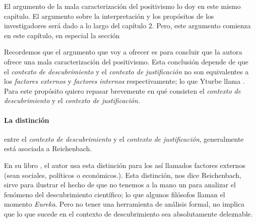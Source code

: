 El argumento de la mala caracterización del positivismo lo doy en este mismo capítulo.
El argumento sobre la interpretación y los propósitos de los investigadores será dado a lo largo del capítulo 2.
Pero, este argumento comienza en este capítulo, en especial la sección 

Recordemos que el argumento que voy a ofrecer es para concluir que la autora ofrece una mala caracterización del positivismo.
Esta conclusión depende de que el \emph{contexto de descubrimiento} y el \emph{contexto de justificación} no son equivalentes a los \emph{factores externos} y \emph{factores internos} respectivamente; lo que Yturbe llama .
Para este propósito quiero repasar brevemente en qué consisten el \emph{contexto de descubrimiento} y el \emph{contexto de justificación.}


\paragraph{La distinción} entre el \emph{contexto de descubrimiento} y el \emph{contexto de justificación}, generalmente está asociada a Reichenbach.

En su libro , el autor usa esta distinción para  los así llamados factores externos (sean sociales, políticos o económicos.).
Esta distinción, nos dice Reichenbach, sirve para ilustrar el hecho de que no tenemos a la mano un  para analizar el fenómeno del descubrimiento científico; lo que algunos filósofos \parencite{reichenbach1938experience, Seo2015} llaman el momento \emph{Eureka}.
Pero no tener una herramienta de análisis formal, no implica que lo que sucede en el contexto de descubrimiento sea absolutamente deleznable.

